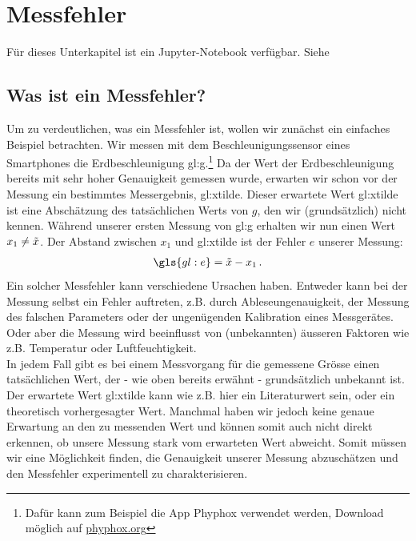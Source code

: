 \section{Messfehler}
\label{chap:fehler:sec:messfehler}

\begin{center}
\begin{tcolorbox}[enhanced,width=6in,center upper,
    fontupper=\large,drop fuzzy shadow southwest,
    colframe=blue!50!black,colback=blue!10]
Für dieses Unterkapitel ist ein Jupyter-Notebook verfügbar. Siehe   
\end{tcolorbox}
\end{center}

\subsection{Was ist ein Messfehler?} %

Um zu verdeutlichen, was ein Messfehler ist, wollen wir zunächst ein einfaches Beispiel betrachten. Wir messen mit dem Beschleunigungssensor eines Smartphones die Erdbeschleunigung  \gls{gl:g}.\footnote{Dafür kann zum Beispiel die App Phyphox verwendet werden, Download möglich auf \href{https://phyphox.org}{phyphox.org}} Da der Wert der Erdbeschleunigung bereits mit sehr hoher Genauigkeit gemessen wurde,  erwarten wir schon vor der Messung ein bestimmtes Messergebnis, \gls{gl:xtilde}. Dieser erwartete Wert \gls{gl:xtilde} ist eine Abschätzung des tatsächlichen Werts von $g$, den wir (grundsätzlich) nicht kennen.  Während unserer ersten Messung von \gls{gl:g} erhalten wir nun einen Wert $x_1 \neq \Tilde{x}$. Der Abstand zwischen $x_1$ und \gls{gl:xtilde} ist der Fehler $e$ unserer Messung:
\begin{align}
\gls{gl:e} = \Tilde{x} - x_1\,.
\label{eq:messfehler}
\end{align}
Ein solcher Messfehler kann verschiedene Ursachen haben. Entweder kann bei der Messung selbst ein Fehler auftreten, z.B. durch  Ableseungenauigkeit, der Messung des falschen Parameters oder der ungenügenden Kalibration eines Messgerätes. Oder aber die Messung wird beeinflusst von (unbekannten) äusseren Faktoren wie z.B. Temperatur oder Luftfeuchtigkeit. \\

In jedem Fall gibt es bei einem Messvorgang für die gemessene Grösse einen tatsächlichen Wert, der - wie oben bereits erwähnt -  grundsätzlich unbekannt ist. Der erwartete Wert \gls{gl:xtilde} kann wie z.B. hier ein Literaturwert sein, oder ein theoretisch vorhergesagter Wert. Manchmal haben wir jedoch keine genaue Erwartung an den zu messenden Wert und können somit auch nicht direkt erkennen, ob unsere Messung stark vom erwarteten Wert abweicht. Somit müssen wir eine Möglichkeit finden, die Genauigkeit unserer Messung abzuschätzen und den Messfehler experimentell zu charakterisieren. 

